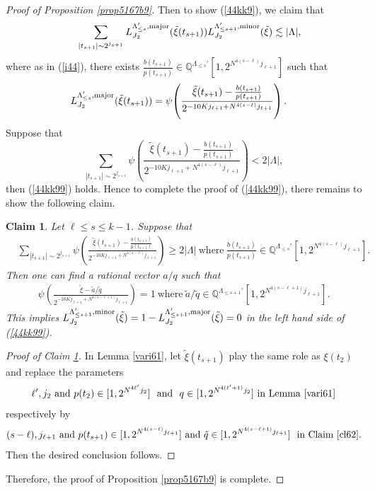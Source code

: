 \documentclass[11 pt,letterpaper]{amsart}
\theoremstyle{plain}
\newtheorem{claim}{Claim}\numberwithin{claim}{section}
\theoremstyle{definition}
\theoremstyle{remark} \theoremstyle{exam} \theoremstyle{ob}
\numberwithin{equation}{section}
\begin{document}
\begin{proof}[Proof of Proposition \ref{prop5167b9}]
  Then to show (\ref{44kk9}), we claim that
\begin{align}\label{44kk99}
&\qquad \sum_{|t_{s+1}|\sim 2^{j_{s+1}}}  L^{\Lambda_{\le s}',\rm{major}}_{J_2}(\tilde{\xi}(t_{s+1}) )L^{\Lambda_{\le s+1}',\rm{minor}}_{J_2}(\tilde{\xi})\lesssim |\Lambda|,
\end{align}
where as in (\ref{i44}), there exists $\frac{b(t_{s+1})}{p(t_{s+1})}\in \mathbb{Q}^{\Lambda_{\le s}'}[1,2^{N^{4(s-\ell)}j_{\ell+1}}]$ such that
\begin{align*}
&L^{\Lambda_{\le s}',\rm{major}}_{J_2}(\tilde{\xi}(t_{s+1}) )
  = 
 \psi\!\left(
    \frac{\tilde{\xi}(t_{s+1})-\frac{b(t_{s+1})}{p(t_{s+1})}}{2^{-10K j_{\ell+1}+N^{4(s-\ell)}j_{\ell+1}}}
  \right).
\end{align*}
Suppose that $$\sum_{|t_{s+1}|\sim 2^{j_{s+1}}}  
   \psi\!\left(
    \frac{\tilde{\xi}(t_{s+1})-\frac{b(t_{s+1})}{p(t_{s+1})}}{2^{-10K j_{\ell+1}+N^{4(s-\ell)}j_{\ell+1}}}
  \right)< 2|\Lambda|,$$  then   (\ref{44kk99}) holds.  Hence to complete the proof of (\ref{44kk99}), there remains to show the following claim.
 



\begin{claim}\label{cl62} 
Let $\ell \le s\le k-1$. Suppose that
\begin{align*} 
&\sum_{|t_{s+1}|\sim 2^{j_{s+1}}}  
   \psi\!\left(
    \frac{\tilde{\xi}(t_{s+1})-\frac{b(t_{s+1})}{p(t_{s+1})}}{2^{-10K j_{\ell+1}+N^{4(s-\ell)}j_{\ell+1}}}
  \right)\ge 2|\Lambda|\ \text{where}\  \frac{b(t_{s+1})}{p(t_{s+1})}\in \mathbb{Q}^{\Lambda_{\le s}'}[1,2^{N^{4(s-\ell)}j_{\ell+1}}].
\end{align*}
Then one can find a rational vector $a/q$ such that
\begin{align*}
 \psi\left(\frac{\tilde{\xi}-\tilde{a}/\tilde{q}}{2^{-10Kj_{\ell+1}+ N^{4(s-\ell+1)}j_{\ell+1} }  }\right)= 1\ \text{where}\  \tilde{a}/\tilde{q}\in \mathbb{Q}^{\Lambda_{\le s+1}'}[1,2^{N^{4(s-\ell+1)}j_{\ell+1}}].
 \end{align*}
This implies $L^{\Lambda_{\le s+1}',\rm{minor}}_{J_2}(\tilde{\xi})=1-L^{\Lambda_{\le s+1}',\rm{major}}_{J_2}(\tilde\xi )=0$ in the left hand side of (\ref{44kk99}).
\end{claim}
\begin{proof}[Proof of  Claim \ref{cl62}]
 In Lemma  \ref{vari61}, let
 $\tilde{\xi}(t_{s+1})$ play the same role as $\xi(t_2)$ and replace the parameters 
 $$\ell',j_2 \ \text{and} \ p(t_2)\in [1,2^{N^{4\ell'}j_2}] \ \text{ and }\  q\in  [1,2^{N^{4(\ell'+1)}j_2}] \ \text{in Lemma \ref{vari61}}$$
respectively by
 $$(s-\ell), j_{\ell+1}  \ \text{and} \ p(t_{s+1})\in[1,2^{N^{4(s-\ell)}j_{\ell+1}}] \  \text{and}\   \tilde{q}\in [1, 2^{N^{4(s-\ell+1)} j_{\ell+1} }] \ \text{  in Claim \ref{cl62}.}$$    Then the desired conclusion follows.
\end{proof}
Therefore,   the   proof of Proposition \ref{prop5167b9} is complete.
 \end{proof}
 
\end{document}
